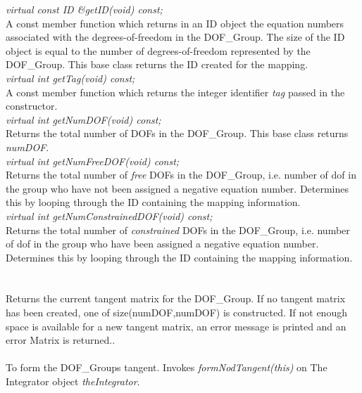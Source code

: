 {\em virtual const ID \&getID(void) const;} \\
A const member function which returns in an ID object the equation
numbers associated with the degrees-of-freedom in the DOF\_Group. The
size of the ID object is equal to the number of degrees-of-freedom
represented by the DOF\_Group. This base class returns the ID created
for the mapping.\\ 

{\em virtual int getTag(void) const;} \\
A const member function which returns the integer identifier {\em
tag} passed in the constructor. \\

{\em virtual int getNumDOF(void) const;}\\
Returns the total number of DOFs in the DOF\_Group. This base class
returns {\em numDOF}.\\

{\em virtual int getNumFreeDOF(void) const;}\\
Returns the total number of {\em free} DOFs in the DOF\_Group,
i.e. number of dof in the group who have not been assigned a negative
equation number. Determines this by looping through the ID containing
the mapping information. \\

{\em virtual int getNumConstrainedDOF(void) const;}\\
Returns the total number of {\em constrained} DOFs in the DOF\_Group,
i.e. number of dof in the group who have been assigned a negative
equation number. Determines this by looping through the ID containing
the mapping information. \\


  \\ 
 \\
Returns the current tangent matrix for the DOF\_Group. If no tangent
matrix has been created, one of size(numDOF,numDOF) is constructed.
If not enough space is available for a new tangent matrix, an error
message is printed and an error Matrix is returned.. \\  

 \\
To form the DOF\_Groups tangent. Invokes {\em formNodTangent(this)} on
The Integrator object {\em theIntegrator}. \\


